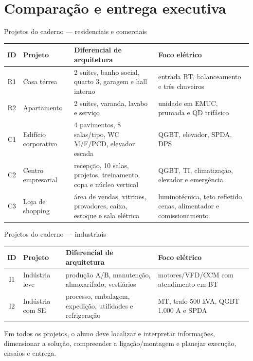 \section{Comparação e entrega executiva}

\begin{frame}{Projetos do caderno — residenciais e comerciais}
\scriptsize
\begin{tabularx}{\textwidth}{c p{3.0cm} p{3.1cm} X}
\toprule
ID & Projeto & Diferencial de arquitetura & Foco elétrico \\
\midrule
R1 & Casa térrea & 2 suítes, banho social, quarto 3, garagem e hall interno & entrada BT, balanceamento e três chuveiros \\
R2 & Apartamento & 2 suítes, varanda, lavabo e serviço & unidade em EMUC, prumada e QD trifásico \\
C1 & Edifício corporativo & 4 pavimentos, 8 salas/tipo, WC M/F/PCD, elevador, escada & QGBT, elevador, SPDA, DPS \\
C2 & Centro empresarial & recepção, 10 salas, projetos, treinamento, copa e núcleo vertical & QGBT, TI, climatização, elevador e emergência \\
C3 & Loja de shopping & área de vendas, vitrines, provadores, caixa, estoque e sala elétrica & luminotécnica, teto refletido, cenas, alimentador e comissionamento \\
\bottomrule
\end{tabularx}
\end{frame}

\begin{frame}{Projetos do caderno — industriais}
\scriptsize
\begin{tabularx}{\textwidth}{c p{3.0cm} p{3.1cm} X}
\toprule
ID & Projeto & Diferencial de arquitetura & Foco elétrico \\
\midrule
I1 & Indústria leve & produção A/B, manutenção, almoxarifado, vestiários & motores/VFD/CCM com atendimento em BT \\
I2 & Indústria com SE & processo, embalagem, expedição, utilidades e refrigeração & MT, trafo 500 kVA, QGBT 1.000 A e SPDA \\
\bottomrule
\end{tabularx}
\begin{caixaProjeto}[title={Sete casos, quatro competências}]
Em todos os projetos, o aluno deve localizar e interpretar informações, dimensionar a solução, compreender a ligação/montagem e planejar execução, ensaios e entrega.
\end{caixaProjeto}
\end{frame}

